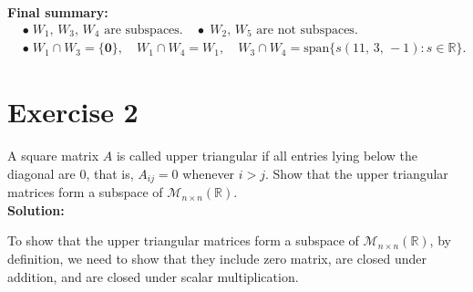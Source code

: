 \documentclass{article}
\begin{document}
\noindent
\textbf{Final summary:}
\[
\begin{aligned}
&\bullet\; W_1,\,W_3,\,W_4 \text{ are subspaces.}
\quad\bullet\; W_2,\,W_5 \text{ are not subspaces.} \\[6pt]
&\bullet\; W_1 \cap W_3 = \{\mathbf{0}\}, 
\quad 
W_1 \cap W_4 = W_1, 
\quad 
W_3 \cap W_4 = \text{span}\{s(11,\,3,\, -1): s \in \mathbb{R}\}.
\end{aligned}
\]

\newpage

\section*{Exercise 2}
A square matrix $A$ is called upper triangular if all entries lying below the diagonal are 0, that is, $A_{ij} = 0$ whenever $i > j$. Show that the upper triangular matrices form a subspace of $\mathcal{M}_{n\times n}(\mathbb{R})$. \\

\textbf{Solution:}

To show that the upper triangular matrices form a subspace of $\mathcal{M}_{n\times n}(\mathbb{R})$, by definition, we need to show that they include zero matrix, are closed under addition, and are closed under scalar multiplication.
\end{document}

